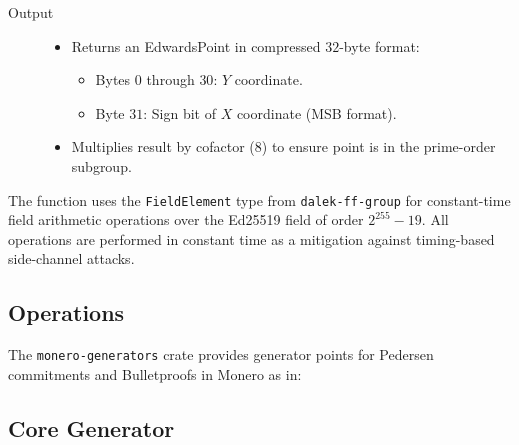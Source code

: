 \documentclass[12pt,a4paper]{article}
\begin{document}
\begin{description}
\item[Output] \hfill
\begin{itemize}
\item Returns an EdwardsPoint in compressed $32$-byte format:  %
  \begin{itemize}
  \item Bytes $0$ through $30$: $Y$ coordinate.
  \item Byte $31$: Sign bit of $X$ coordinate (MSB format).  %
  \end{itemize}
\item Multiplies result by cofactor (8) to ensure point is in the prime-order subgroup.  %
\end{itemize}

\end{description}

The function uses the \texttt{FieldElement} type from \texttt{dalek-ff-group} for constant-time field arithmetic operations over the Ed25519 field of order $2^{255} - 19$.  All operations are performed in constant time as a mitigation against timing-based side-channel attacks.

\subsection{Operations}

The \texttt{monero-generators} crate provides generator points for Pedersen commitments and Bulletproofs in Monero as in:

\subsection{Core Generator}
\end{document}
